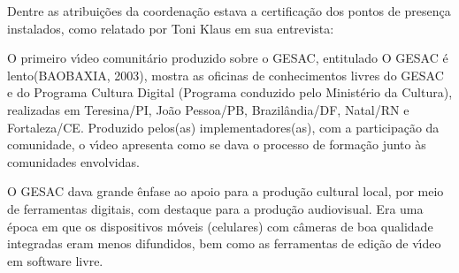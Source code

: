 \documentclass[
12pt,		%
openright,	%
twoside,  %
a4paper,			%
chapter=TITLE,		%
english,			%
french,				%
spanish,			%
brazil				%
]{USPSC-classe/USPSC}
\begin{document}
Dentre as atribui\c{c}\~oes da coordena\c{c}\~ao estava a certifica\c{c}\~ao dos pontos de presen\c{c}a instalados, como relatado por Toni Klaus em sua entrevista:


















\noindent\begin{center}\mbox{\centering{}}\end{center}


O primeiro v\'{\i}deo comunit\'ario produzido sobre o GESAC, entitulado \textquotedbl O GESAC \'e lento\textquotedbl   (BAOBAXIA, 2003),  mostra as oficinas de conhecimentos livres do GESAC e do Programa Cultura Digital (Programa conduzido pelo Minist\'erio da Cultura), realizadas em Teresina/PI, Jo\~ao Pessoa/PB, Brazil\^andia/DF, Natal/RN e Fortaleza/CE. Produzido pelos(as) implementadores(as), com a participa\c{c}\~ao da comunidade, o v\'{\i}deo apresenta como se dava o processo de forma\c{c}\~ao junto \`as comunidades envolvidas.

















O GESAC dava grande \^enfase ao apoio para a produ\c{c}\~ao cultural local, por meio de ferramentas digitais, com destaque para a produ\c{c}\~ao audiovisual. Era uma \'epoca em que os dispositivos m\'oveis (celulares) com c\^ameras de boa qualidade integradas eram menos difundidos, bem como as ferramentas de edi\c{c}\~ao de v\'{\i}deo em software livre.
\end{document}
